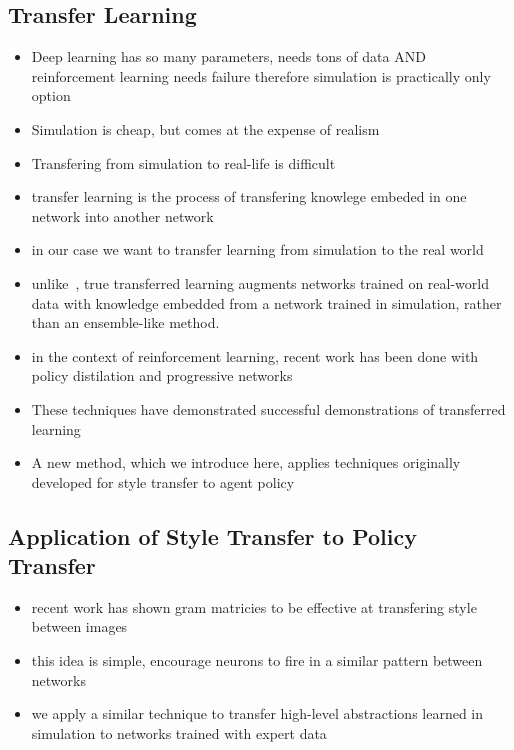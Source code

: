 \documentclass[paper=a4, fontsize=11pt]{scrartcl} %
\begin{document}
	\subsection{Transfer Learning}
	\begin{itemize}
		\item Deep learning has so many parameters, needs tons of data AND reinforcement learning needs failure therefore simulation is practically only option
		\item Simulation is cheap, but comes at the expense of realism
		\item Transfering from simulation to real-life is difficult
		\item transfer learning is the process of transfering knowlege embeded in one network into another network
		\item in our case we want to transfer learning from simulation to the real world
		\item unlike~\cite{Michels2005}, true transferred learning augments networks trained on real-world data with knowledge embedded from a network trained in simulation, rather than an ensemble-like method.
		\item in the context of reinforcement learning, recent work has been done with policy distilation \cite{Rusu2015} and progressive networks \cite{Rusu2016}
		\item These techniques have demonstrated successful demonstrations of transferred learning
		\item A new method, which we introduce here, applies techniques originally developed for style transfer to agent policy~\cite{Gatys2015}
	\end{itemize}

	\subsection{Application of Style Transfer to Policy Transfer}
	\begin{itemize}
		\item recent work has shown gram matricies to be effective at transfering style between images \cite{Gatys2015}
		\item this idea is simple, encourage neurons to fire in a similar pattern between networks
		\item we apply a similar technique to transfer high-level abstractions learned in simulation to networks trained with expert data
	\end{itemize}
\end{document}
